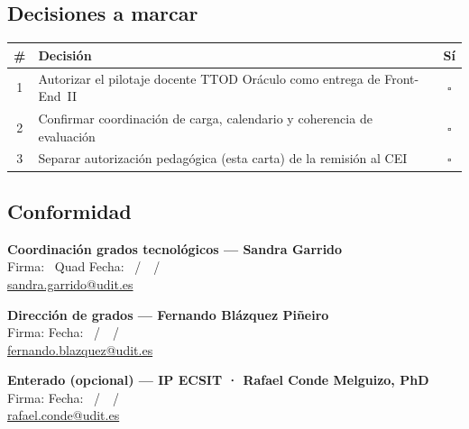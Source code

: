 \documentclass[11pt,a4paper]{scrartcl}
\begin{document}
\subsection*{Decisiones a marcar}
\renewcommand{\arraystretch}{1.3}
\begin{tabularx}{\textwidth}{@{}c>{\raggedright\arraybackslash}X c@{}}
  \toprule
  \textbf{\#} & \textbf{Decisión} & \textbf{Sí} \\
  \midrule
  1 & Autorizar el pilotaje docente TTOD Oráculo como entrega de Front-End~II & $\square$ \\
  2 & Confirmar coordinación de carga, calendario y coherencia de evaluación & $\square$ \\
  3 & Separar autorización pedagógica (esta carta) de la remisión al CEI & $\square$ \\
  \bottomrule
\end{tabularx}

\subsection*{Conformidad}
\vspace{0.6em}
\noindent\textbf{Coordinación grados tecnológicos --- Sandra Garrido}\\[0.35em]
Firma: \hrulefill\ Quad Fecha: \underline{\hspace{1.1cm}}~/~\underline{\hspace{1.1cm}}~/~\underline{\hspace{2cm}}\\
{\scriptsize\href{mailto:sandra.garrido@udit.es}{sandra.garrido@udit.es}}

\vspace{0.9em}
\noindent\textbf{Dirección de grados --- Fernando Blázquez Piñeiro}\\[0.35em]
Firma: \hrulefill\quad Fecha: \underline{\hspace{1.1cm}}~/~\underline{\hspace{1.1cm}}~/~\underline{\hspace{2cm}}\\
{\scriptsize\href{mailto:fernando.blazquez@udit.es}{fernando.blazquez@udit.es}}

\vspace{0.9em}
\noindent\textbf{Enterado (opcional) --- IP ECSIT · Rafael Conde Melguizo, PhD}\\[0.35em]
Firma: \hrulefill\quad Fecha: \underline{\hspace{1.1cm}}~/~\underline{\hspace{1.1cm}}~/~\underline{\hspace{2cm}}\\
{\scriptsize\href{mailto:rafael.conde@udit.es}{rafael.conde@udit.es}}
\end{document}
